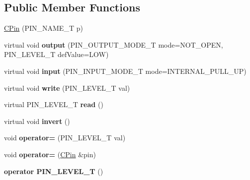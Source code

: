 \subsection*{Public Member Functions}
\begin{DoxyCompactItemize}
\item 
\hyperlink{class_c_pin_a7338f2960b4d8992c43f3c6067742ded}{C\-Pin} (P\-I\-N\-\_\-\-N\-A\-M\-E\-\_\-\-T p)
\item 
\hypertarget{class_c_pin_a84cd9c4613a9b53f00e52c23b4eed050}{virtual void {\bfseries output} (P\-I\-N\-\_\-\-O\-U\-T\-P\-U\-T\-\_\-\-M\-O\-D\-E\-\_\-\-T mode=N\-O\-T\-\_\-\-O\-P\-E\-N, P\-I\-N\-\_\-\-L\-E\-V\-E\-L\-\_\-\-T def\-Value=L\-O\-W)}\label{class_c_pin_a84cd9c4613a9b53f00e52c23b4eed050}

\item 
\hypertarget{class_c_pin_a21aa5b473c1a3637a487c7724f8b9fcf}{virtual void {\bfseries input} (P\-I\-N\-\_\-\-I\-N\-P\-U\-T\-\_\-\-M\-O\-D\-E\-\_\-\-T mode=I\-N\-T\-E\-R\-N\-A\-L\-\_\-\-P\-U\-L\-L\-\_\-\-U\-P)}\label{class_c_pin_a21aa5b473c1a3637a487c7724f8b9fcf}

\item 
\hypertarget{class_c_pin_a1fc3486f4afea4de56ae677c20600551}{virtual void {\bfseries write} (P\-I\-N\-\_\-\-L\-E\-V\-E\-L\-\_\-\-T val)}\label{class_c_pin_a1fc3486f4afea4de56ae677c20600551}

\item 
\hypertarget{class_c_pin_a02060b0c9bbf0f75dead7bef1c75ce6b}{virtual P\-I\-N\-\_\-\-L\-E\-V\-E\-L\-\_\-\-T {\bfseries read} ()}\label{class_c_pin_a02060b0c9bbf0f75dead7bef1c75ce6b}

\item 
\hypertarget{class_c_pin_a240de24c726724aeda90bfacf1d50cc5}{virtual void {\bfseries invert} ()}\label{class_c_pin_a240de24c726724aeda90bfacf1d50cc5}

\item 
\hypertarget{class_c_pin_a7d125bef83689d0f1db13b3f1acbd05e}{void {\bfseries operator=} (P\-I\-N\-\_\-\-L\-E\-V\-E\-L\-\_\-\-T val)}\label{class_c_pin_a7d125bef83689d0f1db13b3f1acbd05e}

\item 
\hypertarget{class_c_pin_a01428eca1b98e2e194bd0848b3eb8904}{void {\bfseries operator=} (\hyperlink{class_c_pin}{C\-Pin} \&pin)}\label{class_c_pin_a01428eca1b98e2e194bd0848b3eb8904}

\item 
\hypertarget{class_c_pin_a9037649d1e88192f5fde46b810c71299}{{\bfseries operator P\-I\-N\-\_\-\-L\-E\-V\-E\-L\-\_\-\-T} ()}\label{class_c_pin_a9037649d1e88192f5fde46b810c71299}


\end{DoxyCompactItemize}
